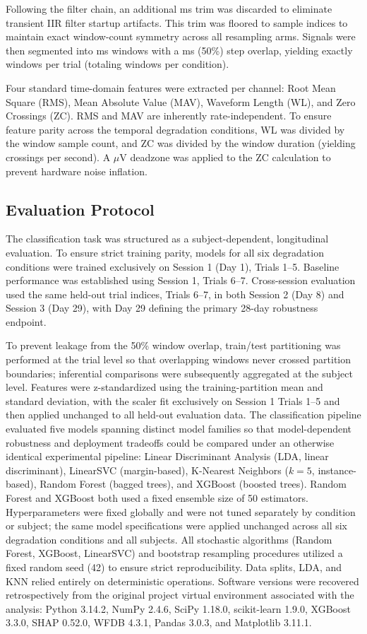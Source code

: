 \documentclass[preprint,12pt]{elsarticle}
\begin{document}
Following the filter chain, an additional \transientMs{} ms trim was discarded to eliminate transient IIR filter startup artifacts. This trim was floored to sample indices to maintain exact window-count symmetry across all resampling arms. Signals were then segmented into \windowMs{} ms windows with a \stepMs{} ms (50\%) step overlap, yielding exactly \nWindows{} windows per trial (totaling \nRows{} windows per condition).

Four standard time-domain features were extracted per channel: Root Mean Square (RMS), Mean Absolute Value (MAV), Waveform Length (WL), and Zero Crossings (ZC). RMS and MAV are inherently rate-independent. To ensure feature parity across the temporal degradation conditions, WL was divided by the window sample count, and ZC was divided by the window duration (yielding crossings per second). A \zcEpsilon{} $\mu$V deadzone was applied to the ZC calculation to prevent hardware noise inflation.

\subsection{Evaluation Protocol}
The classification task was structured as a subject-dependent, longitudinal evaluation. To ensure strict training parity, models for all six degradation conditions were trained exclusively on Session 1 (Day 1), Trials 1--5. Baseline performance was established using Session 1, Trials 6--7. Cross-session evaluation used the same held-out trial indices, Trials 6--7, in both Session 2 (Day 8) and Session 3 (Day 29), with Day 29 defining the primary 28-day robustness endpoint.

To prevent leakage from the 50\% window overlap, train/test partitioning was performed at the trial level so that overlapping windows never crossed partition boundaries; inferential comparisons were subsequently aggregated at the subject level. Features were z-standardized using the training-partition mean and standard deviation, with the scaler fit exclusively on Session 1 Trials 1--5 and then applied unchanged to all held-out evaluation data. The classification pipeline evaluated five models spanning distinct model families so that model-dependent robustness and deployment tradeoffs could be compared under an otherwise identical experimental pipeline: Linear Discriminant Analysis (LDA, linear discriminant), LinearSVC (margin-based), K-Nearest Neighbors ($k=5$, instance-based), Random Forest (bagged trees), and XGBoost (boosted trees). Random Forest and XGBoost both used a fixed ensemble size of 50 estimators. Hyperparameters were fixed globally and were not tuned separately by condition or subject; the same model specifications were applied unchanged across all six degradation conditions and all \nSubjects{} subjects. All stochastic algorithms (Random Forest, XGBoost, LinearSVC) and bootstrap resampling procedures utilized a fixed random seed (42) to ensure strict reproducibility. Data splits, LDA, and KNN relied entirely on deterministic operations. Software versions were recovered retrospectively from the original project virtual environment associated with the analysis: Python 3.14.2, NumPy 2.4.6, SciPy 1.18.0, scikit-learn 1.9.0, XGBoost 3.3.0, SHAP 0.52.0, WFDB 4.3.1, Pandas 3.0.3, and Matplotlib 3.11.1.
\end{document}
